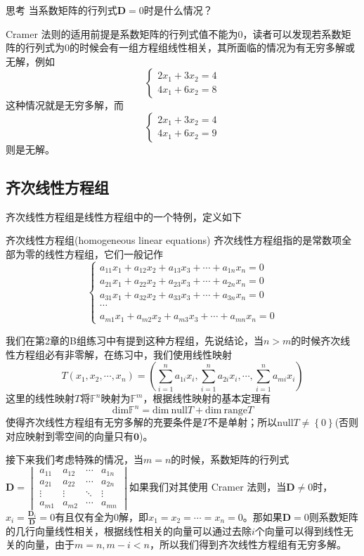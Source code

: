\begin{ascolorbox1}{思考}
	当系数矩阵的行列式$\mathbf{D}=0$时是什么情况？
\end{ascolorbox1}

Cramer 法则的适用前提是系数矩阵的行列式值不能为0，读者可以发现若系数矩阵的行列式为0的时候会有一组方程组线性相关，其所面临的情况为有无穷多解或无解，例如$$\left\{\begin{matrix} 
	2x_1+3x_2 = 4 \\  
	4x_1+6x_2 = 8
  \end{matrix}\right. $$这种情况就是无穷多解，而$$\left\{\begin{matrix} 
	2x_1+3x_2 = 4 \\  
	4x_1+6x_2 = 9
  \end{matrix}\right. $$则是无解。

\subsection{齐次线性方程组}

齐次线性方程组是线性方程组中的一个特例，定义如下
\begin{definition}{齐次线性方程组(homogeneous linear equations)}
	齐次线性方程组指的是常数项全部为零的线性方程组，它们一般记作$$\left\{\begin{matrix} 
		a_{11}x_1+a_{12}x_2+a_{13}x_3+\cdots+a_{1n}x_n=0 \\  
		a_{21}x_1+a_{22}x_2+a_{23}x_3+\cdots+a_{2n}x_n=0 \\  
		a_{31}x_1+a_{32}x_2+a_{33}x_3+\cdots+a_{3n}x_n=0 \\
		\cdots \\
		a_{m1}x_1+a_{m2}x_2+a_{m3}x_3+\cdots+a_{mn}x_n=0
	  \end{matrix}\right. $$
\end{definition}

我们在第2章的B组练习中有提到这种方程组，先说结论，当$n>m$的时候齐次线性方程组必有非零解，在练习中，我们使用线性映射$$T(x_1,x_2,\cdots,x_n)=\left( \sum_{i=1}^{n}a_{1i}x_i,\sum_{i=1}^{n}a_{2i}x_i,\cdots,\sum_{i=1}^{n}a_{mi}x_i \right)$$这里的线性映射$T$将$\mathbb{F}^n$映射为$\mathbb{F}^m$，根据线性映射的基本定理有$$\text{dim}\mathbb{F}^n=\text{dim}~\text{null}T+\text{dim}~\text{range}T$$使得齐次线性方程组有无穷多解的充要条件是$T$不是单射；所以$\text{null}T\neq \left\{ 0 \right\}$(否则对应映射到零空间的向量只有$\boldsymbol{0}$)。

接下来我们考虑特殊的情况，当$m=n$的时候，系数矩阵的行列式$\mathbf{D}=\begin{vmatrix}  
	a_{11}& a_{12}& \cdots  & a_{1n} \\  
	a_{21}& a_{22}& \cdots  & a_{2n} \\  
	\vdots & \vdots & \ddots & \vdots \\  
	a_{m1}& a_{m2}& \cdots  & a_{mn}  
  \end{vmatrix}  
$如果我们对其使用 Cramer 法则，当$\mathbf{D}\neq 0$时，$\displaystyle x_i=\frac{\mathbf{D}_i}{\mathbf{D}}=0$有且仅有全为0解，即$x_1=x_2=\cdots=x_n=0$。那如果$\mathbf{D}= 0$则系数矩阵的几行向量线性相关，根据线性相关的向量可以通过去除$i$个向量可以得到线性无关的向量，由于$m=n,m-i<n$，所以我们得到齐次线性方程组有无穷多解。

